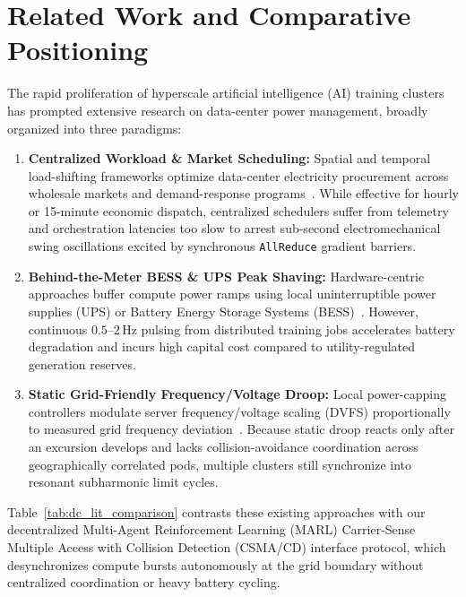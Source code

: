 \documentclass[11pt,fleqn]{article}
\begin{document}
\section{Related Work and Comparative Positioning}
The rapid proliferation of hyperscale artificial intelligence (AI) training clusters has prompted extensive research on data-center power management, broadly organized into three paradigms:
\begin{enumerate}
    \item \textbf{Centralized Workload \& Market Scheduling:} Spatial and temporal load-shifting frameworks optimize data-center electricity procurement across wholesale markets and demand-response programs~\cite{Wierman2014DR,Liu2013Geographical}. While effective for hourly or 15-minute economic dispatch, centralized schedulers suffer from telemetry and orchestration latencies too slow to arrest sub-second electromechanical swing oscillations excited by synchronous \texttt{AllReduce} gradient barriers.
    \item \textbf{Behind-the-Meter BESS \& UPS Peak Shaving:} Hardware-centric approaches buffer compute power ramps using local uninterruptible power supplies (UPS) or Battery Energy Storage Systems (BESS)~\cite{Govindan2011UPS,Wang2012EnergyStorage}. However, continuous $0.5\text{--}2\,\mathrm{Hz}$ pulsing from distributed training jobs accelerates battery degradation and incurs high capital cost compared to utility-regulated generation reserves.
    \item \textbf{Static Grid-Friendly Frequency/Voltage Droop:} Local power-capping controllers modulate server frequency/voltage scaling (DVFS) proportionally to measured grid frequency deviation~\cite{Li2016GridFriendly}. Because static droop reacts only after an excursion develops and lacks collision-avoidance coordination across geographically correlated pods, multiple clusters still synchronize into resonant subharmonic limit cycles.
\end{enumerate}

Table~\ref{tab:dc_lit_comparison} contrasts these existing approaches with our decentralized Multi-Agent Reinforcement Learning (MARL) Carrier-Sense Multiple Access with Collision Detection (CSMA/CD) interface protocol, which desynchronizes compute bursts autonomously at the grid boundary without centralized coordination or heavy battery cycling.
\end{document}
